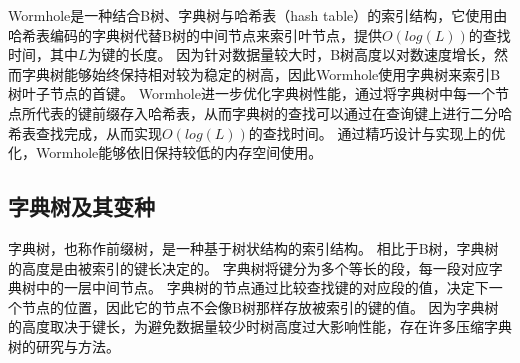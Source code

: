 Wormhole\cite{wu2019wormhole}是一种结合B树、字典树与哈希表（hash table）的索引结构，它使用由哈希表编码的字典树代替B树的中间节点来索引叶节点，提供$O(log(L))$的查找时间，其中$L$为键的长度。
因为针对数据量较大时，B树高度以对数速度增长，然而字典树能够始终保持相对较为稳定的树高，因此Wormhole使用字典树来索引B树叶子节点的首键。
Wormhole进一步优化字典树性能，通过将字典树中每一个节点所代表的键前缀存入哈希表，从而字典树的查找可以通过在查询键上进行二分哈希表查找完成，从而实现$O(log(L))$的查找时间。
通过精巧设计与实现上的优化，Wormhole能够依旧保持较低的内存空间使用。


\subsection{字典树及其变种}

字典树，也称作前缀树，是一种基于树状结构的索引结构。
相比于B树，字典树的高度是由被索引的键长决定的。
字典树将键分为多个等长的段，每一段对应字典树中的一层中间节点。
字典树的节点通过比较查找键的对应段的值，决定下一个节点的位置，因此它的节点不会像B树那样存放被索引的键的值。
因为字典树的高度取决于键长，为避免数据量较少时树高度过大影响性能，存在许多压缩字典树的研究与方法\cite{morrison1968patricia, boehm2011efficient, leis2013adaptive}。


